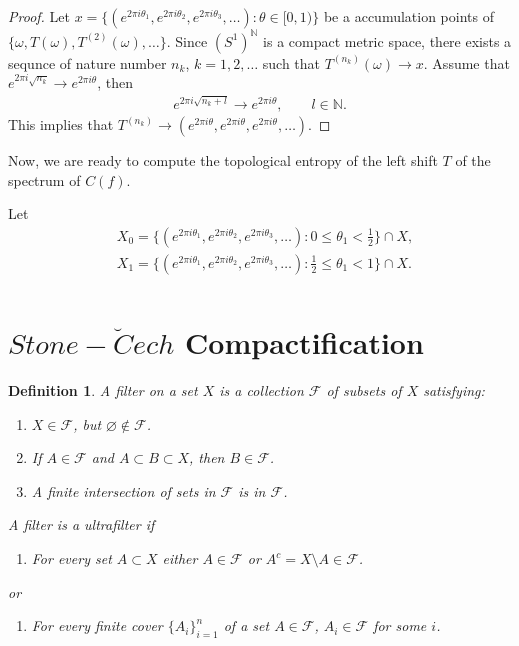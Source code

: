 \documentclass[a4paper,10pt]{amsart}
\newtheorem{definition}{Definition}[section]
\newcommand{\FFF}{\mathcal F}
\newcommand{\N}{\mathbb N} %
\begin{document}
\begin{proof}
   Let $x = \{(e^{2\pi i \theta_1}, e^{2\pi i \theta_2}, 
       e^{2\pi i \theta_3}, \ldots ):\theta \in [0, 1) \}$ 
       be a accumulation points of 
    $\{\omega, T(\omega), T^{(2)}(\omega), \ldots \}$. 
   Since $(S^{1})^{\N}$ is a compact metric space,  
   there exists a sequnce of nature number 
   $n_k$, $k = 1, 2, \ldots$ such that $T^{(n_k)}(\omega) \to x$.
   Assume that $e^{2\pi i \sqrt{n_{k}}} \to e^{2\pi i \theta}$,
   then
   \begin{align*}
       e^{2\pi i \sqrt{n_{k}+l}} \to e^{2\pi i \theta}, \qquad l \in \N.
   \end{align*}
   This implies that $T^{(n_k)} \to 
    (e^{2\pi i \theta}, e^{2\pi i \theta}, e^{2\pi i \theta}, \ldots )$.
\end{proof}

Now, we are ready to compute the topological entropy of the left shift $T$
of the spectrum of $C(f)$.

Let 
\begin{align*}
    &X_{0} = \{(e^{2\pi i\theta_1}, e^{2\pi i\theta_2}, e^{2\pi i\theta_3}, 
\ldots): 0 \leq \theta_1 < \frac{1}{2}\} \cap X, \\
    &X_{1} = \{(e^{2\pi i\theta_1}, e^{2\pi i\theta_2}, e^{2\pi i\theta_3}, 
\ldots): \frac{1}{2} \leq \theta_1 < 1\} \cap X. \\
\end{align*}
    
\section{$Stone-\breve{C}ech$ Compactification}

\begin{definition}
   A filter on a set $X$ is a collection $\FFF$ of subsets of $X$
   satisfying:
   \begin{enumerate}
       \item $X \in \FFF$, but $\varnothing \notin \FFF$.
       \item If $A \in \FFF$ and $A \subset B \subset X$, then 
           $B \in \FFF$.
       \item A finite intersection of sets in $\FFF$ is in $\FFF$.
   \end{enumerate}
   A filter is a ultrafilter if
   \begin{enumerate}[resume] 
       \item For every set $A \subset X$ either $A \in \FFF$
           or $A^{c} = X \setminus A \in \FFF$.  
   \end{enumerate}
   or
   \begin{enumerate}
    \item[(4)'] For every finite cover $\{A_{i}\}_{i=1}^{n}$ of a 
           set $A \in \FFF$, $A_{i} \in \FFF$ for some $i$.
   \end{enumerate}
\end{definition}
\end{document}

